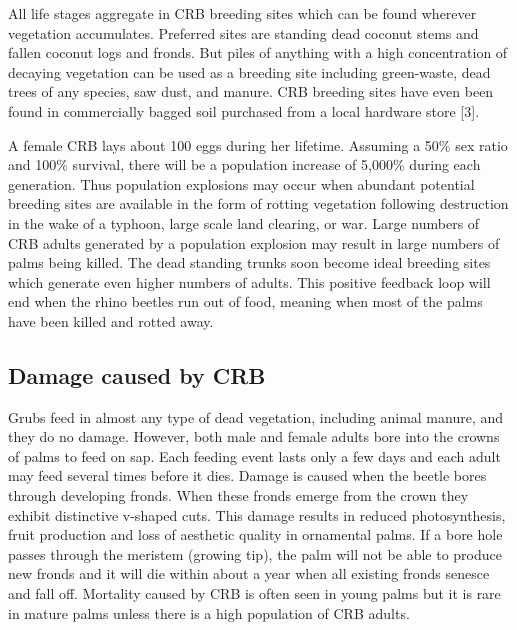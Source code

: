 \documentclass[twocolumn,letterpaper]{scrartcl}
\begin{document}
All life stages aggregate in CRB breeding sites which can be found wherever vegetation accumulates. Preferred sites are standing dead coconut stems and fallen coconut logs and fronds. But piles of anything with a high concentration of decaying vegetation can be used as a breeding site including green-waste, dead trees of any species, saw dust, and manure. CRB breeding sites have even been found in commercially bagged soil purchased from a local hardware store [3]. 

A female CRB lays about 100 eggs during her lifetime. Assuming a 50\% sex ratio and 100\% survival, there will be a population increase of 5,000\% during each generation. Thus population explosions may occur when abundant potential breeding sites are available in the form of rotting vegetation following destruction in the wake of a typhoon, large scale land clearing, or war. Large numbers of CRB adults generated by a population explosion may result in large numbers of palms being killed. The dead standing trunks soon become ideal breeding sites which generate even higher numbers of adults. This positive feedback loop will end when the rhino beetles run out of food, meaning when most of the palms have been killed and rotted away.

\subsection{Damage caused by CRB}
Grubs feed in almost any type of dead vegetation, including animal manure,  and they do no damage. However, both male and female adults bore into the crowns of palms to feed on sap. Each feeding event lasts only a few days and each adult may feed several times before it dies. Damage is caused when the beetle bores through developing fronds. When these fronds emerge from the crown they exhibit distinctive v-shaped cuts. This damage results in reduced photosynthesis, fruit production and loss of aesthetic quality in ornamental palms. If a bore hole passes through the meristem (growing tip), the palm will not be able to produce new fronds and it will die within about a year when all existing fronds senesce and fall off. Mortality caused by CRB is often seen in young palms but it is rare in mature palms unless there is a high population of CRB adults. 
\end{document}
